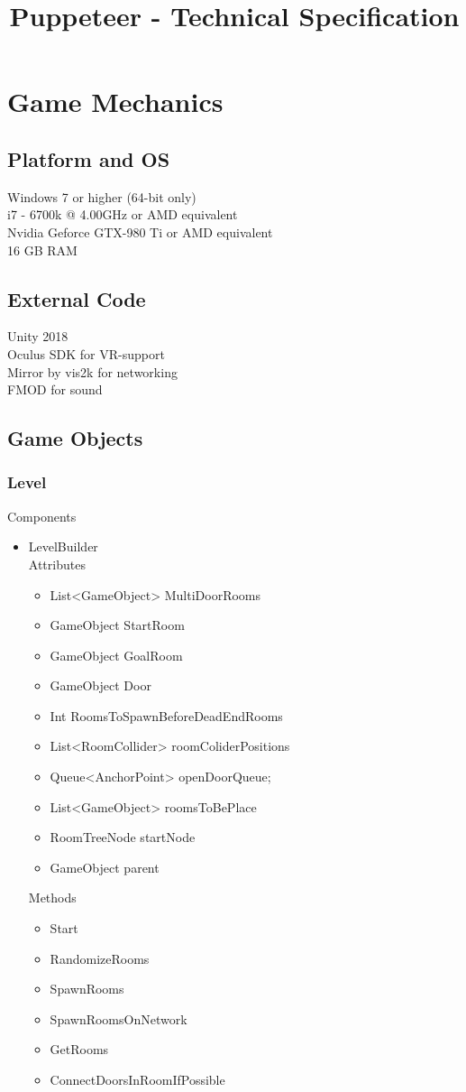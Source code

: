 \documentclass[11pt]{article}
\title{Puppeteer - Technical Specification}
\begin{document}
\maketitle


\newpage
\section{Game Mechanics}
\subsection{Platform and OS}
Windows 7 or higher (64-bit only)
\\i7 - 6700k @ 4.00GHz or AMD equivalent
\\Nvidia Geforce GTX-980 Ti or AMD equivalent
\\16 GB RAM

\subsection{External Code}
Unity 2018
\\Oculus SDK for VR-support
\\Mirror by vis2k for networking
\\FMOD for sound

\subsection{Game Objects}
\subsubsection{Level}
Components
\begin{itemize}
\item LevelBuilder
\\Attributes
\begin{itemize}
\item List<GameObject> MultiDoorRooms
\item GameObject StartRoom
\item GameObject GoalRoom
\item GameObject Door
\item Int RoomsToSpawnBeforeDeadEndRooms
\item List<RoomCollider> roomColiderPositions
\item Queue<AnchorPoint> openDoorQueue;
\item List<GameObject> roomsToBePlace
\item RoomTreeNode startNode
\item GameObject parent
\end{itemize}
Methods
\begin{itemize}
\item Start
\item RandomizeRooms
\item SpawnRooms
\item SpawnRoomsOnNetwork
\item GetRooms
\item ConnectDoorsInRoomIfPossible
\end{itemize}
\end{itemize}
\end{document}
